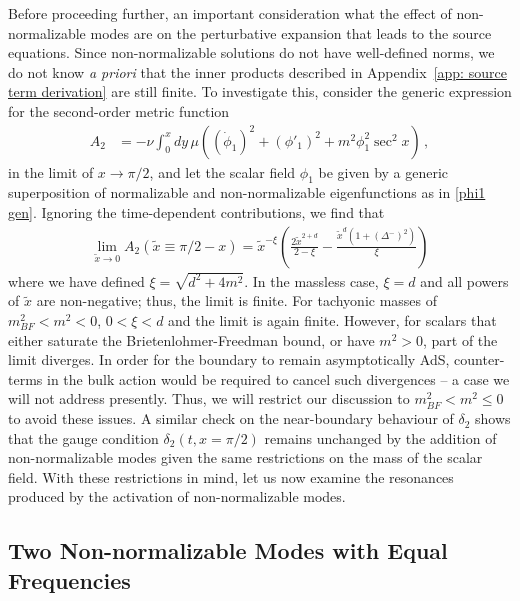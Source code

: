 \documentclass[letterpaper,11pt]{article}
\begin{document}
Before proceeding further, an important consideration what the effect of non-normalizable modes are on the perturbative expansion that leads to the source equations. Since non-normalizable solutions do not have well-defined norms, we do not know \emph{a priori} that the inner products described in Appendix~\ref{app: source term derivation} are still finite. To investigate this, consider the generic expression for the second-order metric function
\begin{align}
A_2 &= - \nu \int^x_0 dy \, \mu \left( (\dot \phi_1)^2 + (\phi'_1)^2 + m^2 \phi_1^2 \sec^2 x \right) \, ,
\end{align}
in the limit of $x \to \pi/2$, and let the scalar field $\phi_1$ be given by a generic superposition of normalizable and non-normalizable eigenfunctions as in \eqref{phi1 gen}. Ignoring the time-dependent contributions, we find that
\begin{align}
\lim_{\tilde x \to 0} A_2 (\tilde x \equiv \pi /2 - x) = \tilde{x}^{-\xi} \left( \frac{2 \tilde{x}^{2+d}}{2 - \xi} - \frac{\tilde{x}^d (1 + \left(\Delta^{-}\right)^2)}{\xi} \right)
\end{align}
where we have defined $\xi = \sqrt{d^2 + 4m^2}$. In the massless case, $\xi = d$ and all powers of $\tilde{x}$ are non-negative; thus, the limit is finite. For tachyonic masses of $m^2_{BF} < m^2 < 0$, $0 < \xi < d$ and the limit is again finite. However, for scalars that either saturate the Brietenlohmer-Freedman bound, or have $m^2 > 0$, part of the limit diverges. In order for the boundary to remain asymptotically AdS, counter-terms in the bulk action would be required to cancel such divergences -- a case we will not address presently. Thus, we will restrict our discussion to $m^2_{BF} < m^2 \leq 0$ to avoid these issues. A similar check on the near-boundary behaviour of $\delta_2$ shows that the gauge condition $\delta_2 (t, x=\pi/2)$ remains unchanged by the addition of non-normalizable modes given the same restrictions on the mass of the scalar field. With these restrictions in mind, let us now examine the resonances produced by the activation of non-normalizable modes.

\subsection{Two Non-normalizable Modes with Equal Frequencies}
\label{ssec: equalNN}
\end{document}

